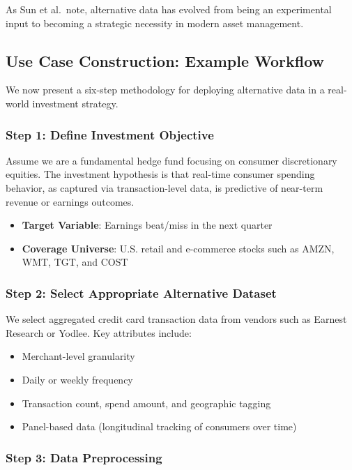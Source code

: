 As Sun et al.\ note, alternative data has evolved from being an experimental input to becoming a strategic necessity in modern asset management.

\subsection{Use Case Construction: Example Workflow}

We now present a six-step methodology for deploying alternative data in a real-world investment strategy.

\subsubsection{Step 1: Define Investment Objective}

Assume we are a fundamental hedge fund focusing on consumer discretionary equities. The investment hypothesis is that real-time consumer spending behavior, as captured via transaction-level data, is predictive of near-term revenue or earnings outcomes.

\begin{itemize}
    \item \textbf{Target Variable}: Earnings beat/miss in the next quarter
    \item \textbf{Coverage Universe}: U.S. retail and e-commerce stocks such as AMZN, WMT, TGT, and COST
\end{itemize}

\subsubsection{Step 2: Select Appropriate Alternative Dataset}

We select aggregated credit card transaction data from vendors such as Earnest Research or Yodlee. Key attributes include:

\begin{itemize}
    \item Merchant-level granularity
    \item Daily or weekly frequency
    \item Transaction count, spend amount, and geographic tagging
    \item Panel-based data (longitudinal tracking of consumers over time)
\end{itemize}

\subsubsection{Step 3: Data Preprocessing}

